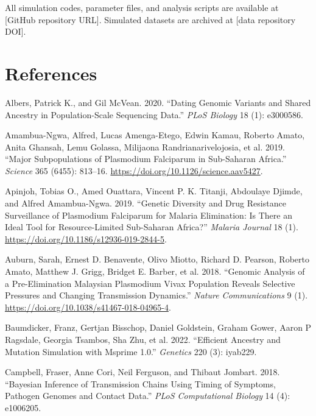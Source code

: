 \documentclass[
  11pt,
]{article}
\newlength{\cslhangindent}
\newenvironment{CSLReferences}[2] %
 {\begin{list}{}{%
  \setlength{\itemindent}{0pt}
  \setlength{\leftmargin}{0pt}
  \setlength{\parsep}{0pt}
  \ifodd #1
   \setlength{\leftmargin}{\cslhangindent}
   \setlength{\itemindent}{-1\cslhangindent}
  \fi
  \setlength{\itemsep}{#2\baselineskip}}}
 {\end{list}}
\begin{document}
All simulation codes, parameter files, and analysis scripts are
available at {[}GitHub repository URL{]}. Simulated datasets are
archived at {[}data repository DOI{]}.

\newpage

\section*{References}\label{references}

\label{refs}
\begin{CSLReferences}{1}{0}
Albers, Patrick K., and Gil McVean. 2020. {``Dating Genomic Variants and
Shared Ancestry in Population-Scale Sequencing Data.''} \emph{PLoS
Biology} 18 (1): e3000586.

Amambua-Ngwa, Alfred, Lucas Amenga-Etego, Edwin Kamau, Roberto Amato,
Anita Ghansah, Lemu Golassa, Milijaona Randrianarivelojosia, et al.
2019. {``Major Subpopulations of Plasmodium Falciparum in Sub-Saharan
Africa.''} \emph{Science} 365 (6455): 813--16.
\url{https://doi.org/10.1126/science.aav5427}.

Apinjoh, Tobias O., Amed Ouattara, Vincent P. K. Titanji, Abdoulaye
Djimde, and Alfred Amambua-Ngwa. 2019. {``Genetic Diversity and Drug
Resistance Surveillance of Plasmodium Falciparum for Malaria
Elimination: Is There an Ideal Tool for Resource-Limited Sub-Saharan
Africa?''} \emph{Malaria Journal} 18 (1).
\url{https://doi.org/10.1186/s12936-019-2844-5}.

Auburn, Sarah, Ernest D. Benavente, Olivo Miotto, Richard D. Pearson,
Roberto Amato, Matthew J. Grigg, Bridget E. Barber, et al. 2018.
{``Genomic Analysis of a Pre-Elimination Malaysian Plasmodium Vivax
Population Reveals Selective Pressures and Changing Transmission
Dynamics.''} \emph{Nature Communications} 9 (1).
\url{https://doi.org/10.1038/s41467-018-04965-4}.

Baumdicker, Franz, Gertjan Bisschop, Daniel Goldstein, Graham Gower,
Aaron P Ragsdale, Georgia Tsambos, Sha Zhu, et al. 2022. {``Efficient
Ancestry and Mutation Simulation with Msprime 1.0.''} \emph{Genetics}
220 (3): iyab229.

Campbell, Fraser, Anne Cori, Neil Ferguson, and Thibaut Jombart. 2018.
{``Bayesian Inference of Transmission Chains Using Timing of Symptoms,
Pathogen Genomes and Contact Data.''} \emph{PLoS Computational Biology}
14 (4): e1006205.


\end{CSLReferences}
\end{document}
